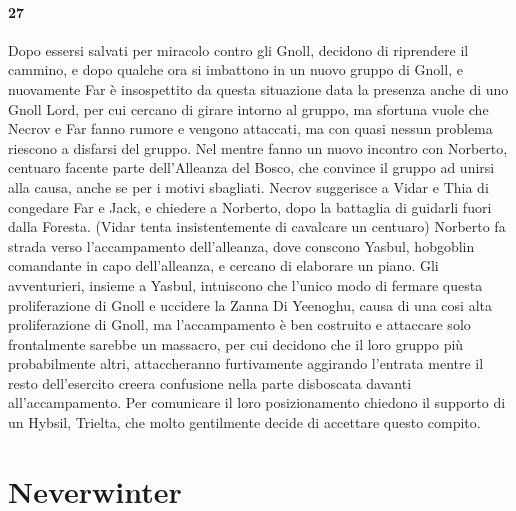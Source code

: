 \documentclass{article}
\begin{document}
      \paragraph{27} Dopo essersi salvati per miracolo contro gli Gnoll, decidono di riprendere il cammino, e dopo qualche ora si imbattono in un nuovo gruppo di Gnoll, e nuovamente Far è insospettito da questa situazione data la presenza anche di uno Gnoll Lord, per cui cercano di girare intorno al gruppo, ma sfortuna vuole che Necrov e Far fanno rumore e vengono attaccati, ma con quasi nessun problema riescono a disfarsi del gruppo. Nel mentre fanno un nuovo incontro con Norberto, centuaro facente parte dell'Alleanza del Bosco, che convince il gruppo ad unirsi alla causa, anche se per i motivi sbagliati. Necrov suggerisce a Vidar e Thia di congedare Far e Jack, e chiedere a Norberto, dopo la battaglia di guidarli fuori dalla Foresta. (Vidar tenta insistentemente di cavalcare un centuaro) Norberto fa strada verso l'accampamento dell'alleanza, dove conscono Yasbul, hobgoblin comandante in capo dell'alleanza, e cercano di elaborare un piano. Gli avventurieri, insieme a Yasbul, intuiscono che l'unico modo di fermare questa proliferazione di Gnoll e uccidere la Zanna Di Yeenoghu, causa di una cosi alta proliferazione di Gnoll, ma l'accampamento è ben costruito e attaccare solo frontalmente sarebbe un massacro, per cui decidono che il loro gruppo più probabilmente altri, attaccheranno furtivamente aggirando l'entrata mentre il resto dell'esercito creera confusione nella parte disboscata davanti all'accampamento. Per comunicare il loro posizionamento chiedono il supporto di un Hybsil, Trielta, che molto gentilmente decide di accettare questo compito. 
\section{Neverwinter}
\end{document}
